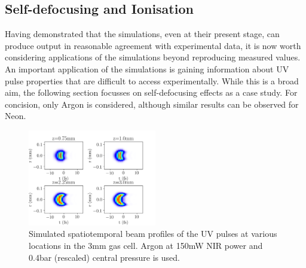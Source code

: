 \documentclass[a4paper]{jpconf}
\begin{document}
\subsection{Self-defocusing and Ionisation}
Having demonstrated that the simulations, even at their present stage, can produce output in reasonable agreement with experimental data, it is now worth considering applications of the simulations beyond reproducing measured values. An important application of the simulations is gaining information about UV pulse properties that are difficult to access experimentally. While this is a broad aim, the following section focusses on self-defocusing effects as a case study. For concision, only Argon is considered, although similar results can be observed for Neon. \par  
\begin{figure}[H]
\centering
\includegraphics[width=0.5\textwidth]{im/UV_pulse_evolution_Ar_ion}
\caption{Simulated spatiotemporal beam profiles of the UV pulses at various locations in the 3mm gas cell. Argon at 150mW NIR power and 0.4bar (rescaled) central pressure is used.}\label{im:prop}

\end{figure}
\end{document}
